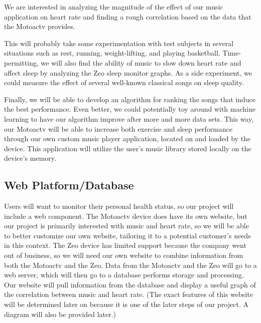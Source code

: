 \documentclass[letterpaper,english, 12pt]{scrreprt}
\begin{document}
We are interested in analyzing the magnitude of the effect of our music application on heart rate and finding a rough correlation based on the data that the Motoactv provides.

This will probably take some experimentation with test subjects in several situations such as rest, running, weight-lifting, and playing basketball. Time-permitting, we will also find the ability of music to slow down heart rate and affect sleep by analyzing the Zeo sleep monitor graphs. As a side experiment, we could measure the effect of several well-known classical songs on sleep quality.
			 
Finally, we will be able to develop an algorithm for ranking the songs that induce the best performance. Even better, we could potentially toy around with machine learning to have our algorithm improve after more and more data sets. This way, our Motoactv will be able to increase both exercise and sleep performance through our own custom music player application, located on and loaded by the device. This application will utilize the user's music library stored locally on the device's memory.

\subsection{Web Platform/Database}
Users will want to monitor their personal health status, so our project will include a web component. The Motoactv device does have its own website, but our project is primarily interested with music and heart rate, so we will be able to better customize our own website, tailoring it to a potential customer's needs in this context. The Zeo device has limited support because the company went out of business, so we will need our own website to combine information from both the Motoactv and the Zeo. Data from the Motoactv and the Zeo will go to a web server, which will then go to a database performs storage and processing. Our website will pull information from the database and display a useful graph of the correlation between music and heart rate. (The exact features of this website will be determined later on because it is one of the later steps of our project. A diagram will also be provided later.)
\end{document}
